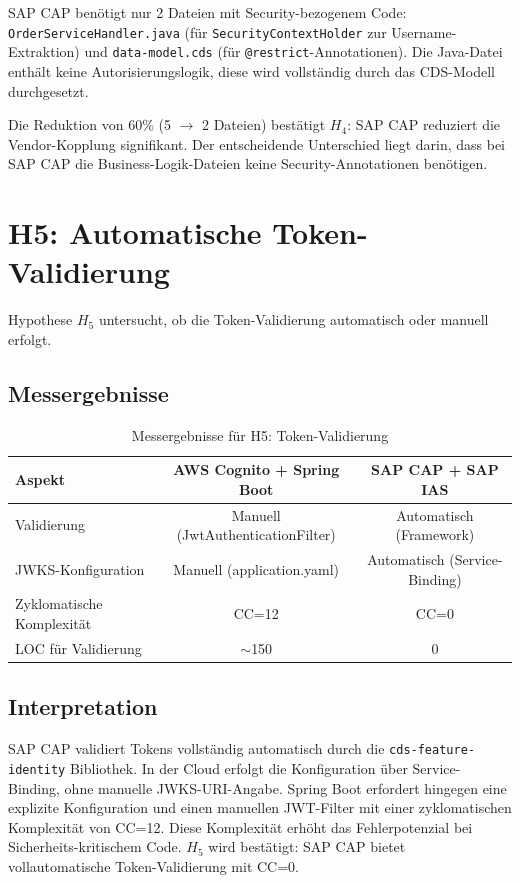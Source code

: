 \ac{SAP CAP} benötigt nur 2 Dateien mit Security-bezogenem Code: \texttt{OrderServiceHandler.java} (für \texttt{SecurityContextHolder} zur Username-Extraktion) und \texttt{data-model.cds} (für \texttt{@restrict}-Annotationen). Die Java-Datei enthält keine Autorisierungslogik, diese wird vollständig durch das \ac{CDS}-Modell durchgesetzt.

Die Reduktion von 60\% (5 $\rightarrow$ 2 Dateien) bestätigt $H_4$: \ac{SAP CAP} reduziert die Vendor-Kopplung signifikant. Der entscheidende Unterschied liegt darin, dass bei \ac{SAP CAP} die Business-Logik-Dateien keine Security-Annotationen benötigen.


\section{H5: Automatische Token-Validierung}

Hypothese $H_5$ untersucht, ob die Token-Validierung automatisch oder manuell
erfolgt.

\subsection{Messergebnisse}

\begin{table}[h]
    \centering
    \begin{tabular}{|l|c|c|}
        \hline
        \textbf{Aspekt}  & \textbf{AWS Cognito + Spring Boot}  & \textbf{SAP CAP + SAP IAS} \\
        \hline
        Validierung  & Manuell (JwtAuthenticationFilter) & Automatisch (Framework)  \\
        \hline
        JWKS-Konfiguration & Manuell (application.yaml)  & Automatisch (Service-Binding)  \\
        \hline
        Zyklomatische Komplexität  & CC=12 & CC=0 \\
        \hline
        LOC für Validierung  & $\sim$150 & 0  \\
        \hline
    \end{tabular}
    \caption{Messergebnisse für H5: Token-Validierung}
    \label{tab:h5_ergebnisse}
\end{table}

\subsection{Interpretation}

\ac{SAP CAP} validiert Tokens vollständig automatisch durch die \texttt{cds-feature-identity} Bibliothek. In der Cloud erfolgt die Konfiguration über Service-Binding, ohne manuelle JWKS-URI-Angabe. Spring Boot erfordert hingegen eine explizite Konfiguration und einen manuellen JWT-Filter mit einer zyklomatischen Komplexität von CC=12. Diese Komplexität erhöht das Fehlerpotenzial bei Sicherheits-kritischem Code. $H_5$ wird bestätigt: \ac{SAP CAP} bietet vollautomatische Token-Validierung mit CC=0.


